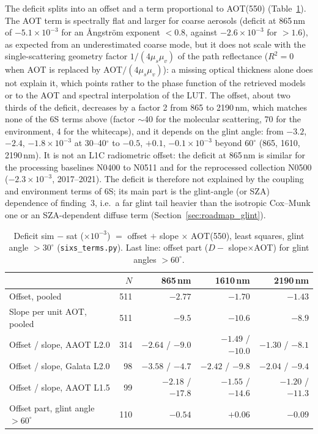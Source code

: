 \documentclass[11pt,a4paper]{article}
\newcommand{\code}[1]{\texttt{#1}}
\begin{document}
The deficit splits into an offset and a term proportional to AOT(550) (Table~\ref{tab:sixs}). The AOT term is
spectrally flat and larger for coarse aerosols (deficit at 865\,nm of $-5.1\times10^{-3}$ for an Ångström exponent
$<0.8$, against $-2.6\times10^{-3}$ for $>1.6$), as expected from an underestimated coarse mode, but it does not
scale with the single-scattering geometry factor $1/(4\mu_s\mu_v)$ of the path reflectance ($R^2 = 0$ when AOT is
replaced by AOT$/(4\mu_s\mu_v)$): a missing optical thickness alone does not explain it, which points rather to the
phase function of the retrieved models or to the AOT and spectral interpolation of the LUT. The offset, about
two thirds of the deficit, decreases by a factor 2 from 865 to 2190\,nm, which matches none of the 6S terms above
(factor $\sim$40 for the molecular scattering, 70 for the environment, 4 for the whitecaps), and it depends on the
glint angle: from $-3.2$, $-2.4$, $-1.8\times10^{-3}$ at 30--40$^\circ$ to $-0.5$, $+0.1$, $-0.1\times10^{-3}$
beyond $60^\circ$ (865, 1610, 2190\,nm). It is not an L1C radiometric offset: the deficit at 865\,nm is similar for
the processing baselines N0400 to N0511 and for the reprocessed collection N0500 ($-2.3\times10^{-3}$, 2017--2021).
The deficit is therefore not explained by the coupling and environment terms of 6S; its main part is the
glint-angle (or SZA) dependence of finding~3, i.e.\ a far glint tail heavier than the isotropic Cox--Munk one or an
SZA-dependent diffuse term (Section~\ref{sec:roadmap_glint}).

\begin{table}[h]
\centering\small
\caption{Deficit sim $-$ sat ($\times10^{-3}$) $=$ offset $+$ slope $\times$ AOT(550), least squares, glint angle
$>30^\circ$ (\code{sixs\_terms.py}). Last line: offset part ($D - $ slope$\times$AOT) for glint angles $>60^\circ$.}
\label{tab:sixs}
\begin{tabular}{lrrrr}
\toprule
 & $N$ & 865\,nm & 1610\,nm & 2190\,nm \\
\midrule
Offset, pooled            & 511 & $-2.77$ & $-1.70$ & $-1.43$ \\
Slope per unit AOT, pooled & 511 & $-9.5$ & $-10.6$ & $-8.9$ \\
Offset / slope, AAOT L2.0 & 314 & $-2.64$ / $-9.0$ & $-1.49$ / $-10.0$ & $-1.30$ / $-8.1$ \\
Offset / slope, Galata L2.0 & 98 & $-3.58$ / $-4.7$ & $-2.42$ / $-9.8$ & $-2.04$ / $-9.4$ \\
Offset / slope, AAOT L1.5 & 99 & $-2.18$ / $-17.8$ & $-1.55$ / $-14.6$ & $-1.20$ / $-11.3$ \\
Offset part, glint angle $>60^\circ$ & 110 & $-0.54$ & $+0.06$ & $-0.09$ \\
\bottomrule
\end{tabular}
\end{table}
\end{document}
